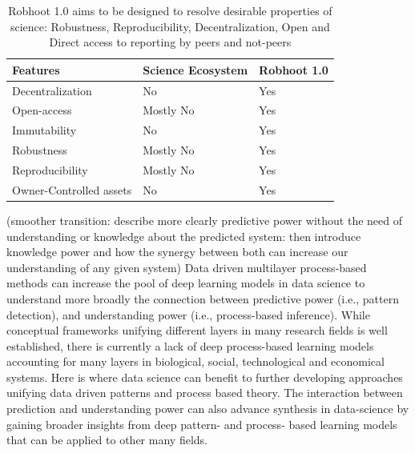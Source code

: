 \documentclass[10pt, a4paper, twocolumn]{article} %
\begin{document}
\begin{table}
\begin{tabular}{ p{3cm} | p{2cm} | p{2cm}}
  \hline \hline
  \textbf{Features} & \textbf{Science Ecosystem} &\textbf{Robhoot 1.0}\\  \hline
  Decentralization & No & Yes \\ \hline
  Open-access & Mostly No & Yes \\ \hline
  Immutability & No & Yes \\ \hline
  Robustness & Mostly No & Yes \\ \hline
  Reproducibility & Mostly No & Yes \\ \hline        
  Owner-Controlled assets & No & Yes \\ \hline       
  \bottomrule

\end{tabular}
\caption{Robhoot 1.0 aims to be designed to resolve desirable
  properties of science: Robustness, Reproducibility,
  Decentralization, Open and Direct access to reporting by peers and
  not-peers}
\end{table}

(smoother transition: describe more clearly predictive power without
the need of understanding or knowledge about the predicted system:
then introduce knowledge power and how the synergy between both can
increase our understanding of any given system) Data driven multilayer
process-based methods can increase the pool of deep learning models in
data science to understand more broadly the connection between
predictive power (i.e., pattern detection), and understanding power
(i.e., process-based inference). While conceptual frameworks unifying
different layers in many research fields is well established, there is
currently a lack of deep process-based learning models accounting for
many layers in biological, social, technological and economical
systems. Here is where data science can benefit to further developing
approaches unifying data driven patterns and process based theory. The
interaction between prediction and understanding power can also
advance synthesis in data-science by gaining broader insights from
deep pattern- and process- based learning models that can be applied
to other many fields.

\end{document}

